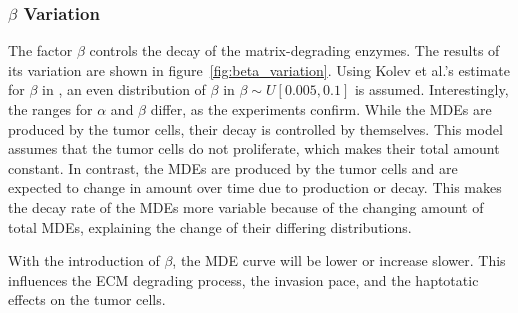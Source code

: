 \subsubsection*{$\beta$ Variation}
The factor $\beta$ controls the decay of the matrix-degrading enzymes. The results of its variation are shown in figure~\ref{fig:beta_variation}. Using Kolev et al.'s estimate for $\beta$ in \cite{Kolev2010}, an even distribution of $\beta$ in $\beta \sim U[0.005, 0.1]$ is assumed. Interestingly, the ranges for $\alpha$ and $\beta$ differ, as the experiments confirm. While the MDEs are produced by the tumor cells, their decay is controlled by themselves. This model assumes that the tumor cells do not proliferate, which makes their total amount constant. In contrast, the MDEs are produced by the tumor cells and are expected to change in amount over time due to production or decay. This makes the decay rate of the MDEs more variable because of the changing amount of total MDEs, explaining the change of their differing distributions.

With the introduction of $\beta$, the MDE curve will be lower or increase slower. This influences the ECM degrading process, the invasion pace, and the haptotatic effects on the tumor cells. 

